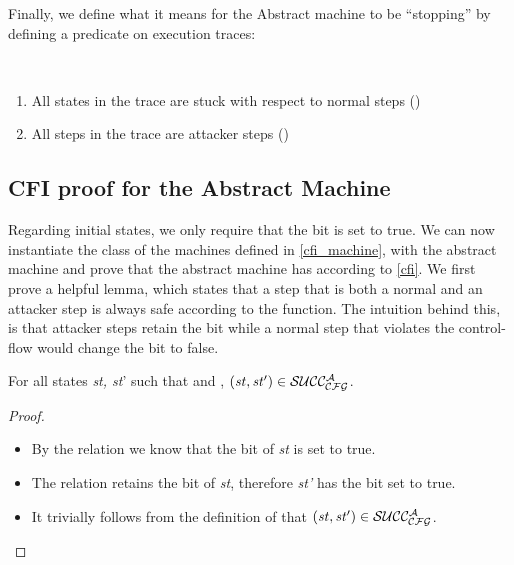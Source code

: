 Finally, we define what it means for the Abstract machine to be ``stopping'' by
defining a predicate on execution traces:

\begin{definition}
\label{abstract_stopping}
~
\begin{enumerate}
\item All states in the trace are stuck with respect to normal steps
  (\stepn{}{})
\item All steps in the trace are attacker steps (\stepa{}{}{})
\end{enumerate}
\end{definition}

\subsection{CFI proof for the Abstract Machine}\label{abstract_proof}

Regarding initial states, we only require that the \ok bit is set to
true.  We can now instantiate the class of the machines defined in
\cref{cfi_machine}, with the abstract machine and prove that the
abstract machine has \CFI according to \cref{cfi}.  We first prove a
helpful lemma, which states that a step that is both a normal and an
attacker step is always safe according to the  function. The
intuition behind this, is that attacker steps retain the \ok bit while
a normal step that violates the control-flow would change the \ok bit
to false.

\begin{lemma}
\label{attacker_no_v}
For all states \textit{st, st}' such that 
and , $(\mathit{st},\mathit{st'}) \in \mathcal{SUCC_\mathcal{CFG}^{A}}$.
\end{lemma}

\begin{proof}
~
\begin{itemize}
\item By the relation  we know that the \ok bit
of \textit{st} is set to true.
\item The relation  retains the \ok bit of
\textit{st}, therefore \textit{st'} has the \ok bit set to true.
\item It trivially follows from the definition of  that
$(\mathit{st},\mathit{st'}) \in \mathcal{SUCC_\mathcal{CFG}^{A}}$.
\end{itemize}
\end{proof}


